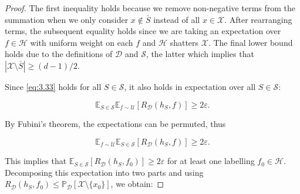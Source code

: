 \begin{proof}
The first inequality holds because we remove non-negative terms from the summation when we only consider $x\notin\overline S$ instead of all $x\in\mathcal X$. After rearranging terms, the subsequent equality holds since we are taking an expectation over $f\in\mathcal H$ with uniform weight on each $f$ and $\mathcal H$ shatters $\mathcal X$. The final lower bound holds due to the definitions of $\mathcal D$ and $\mathcal S$, the latter which implies that $|\mathcal X\setminus\overline S|\ge (d-1)/2$.

Since \eqref{eq:3.33} holds for all $S\in\mathcal S$, it also holds in expectation over all $S\in\mathcal S$:

\begin{equation}\label{eq:3.34}
\mathbb{E}_{S\in\mathcal S}\mathbb{E}_{f\sim\mathcal U}[R_{\mathcal D}(h_S,f)]\ge 2\varepsilon.
\end{equation}

By Fubini's theorem, the expectations can be permuted, thus

\[\mathbb{E}_{f\sim\mathcal U}\mathbb{E}_{S\in\mathcal S}[R_{\mathcal D}(h_S,f)]\ge 2\varepsilon.\]

This implies that $\mathbb{E}_{S\in\mathcal S}[R_{\mathcal D}(h_S,f_0)]\ge 2\varepsilon$ for at least one labelling $f_0\in\mathcal H$. Decomposing this expectation into two parts and using $R_{\mathcal D}(h_S,f_0)\le \mathbb{P}_{\mathcal D}[\mathcal X\setminus\{x_0\}]$, we obtain:


\end{proof}
